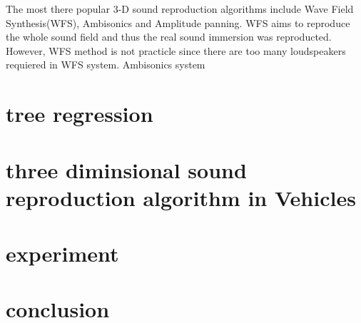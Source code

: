 \documentclass[runningheads,a4paper]{llncs}
\begin{document}

The most there popular 3-D sound reproduction algorithms include Wave Field Synthesis(WFS), Ambisonics and Amplitude panning. WFS aims to reproduce the whole sound field and thus the real sound immersion was reproducted. However, WFS method is not practicle since there are too many loudspeakers requiered in WFS system. Ambisonics system  


\section{tree regression}\label{sec:regression}

\section{three diminsional sound reproduction algorithm in Vehicles}\label{sec:algorithm}

\section{experiment}\label{sec:experiment}

\section{conclusion}\label{sec:conclusion}

\label{bib:bibliography}



\end{document}
